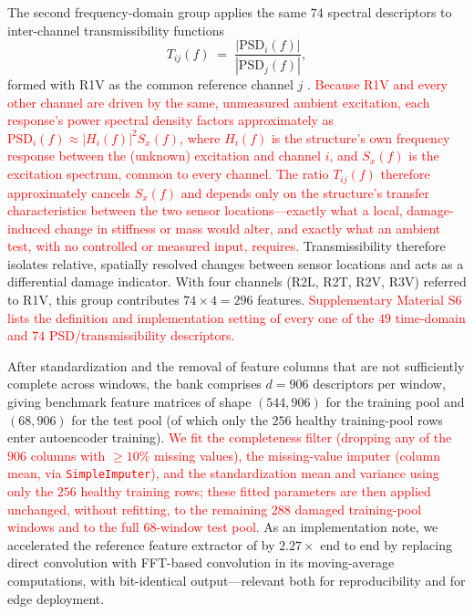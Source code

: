 \documentclass[11pt,a4paper]{article}
\begin{document}
The second frequency-domain group applies the same $74$ spectral descriptors to
inter-channel transmissibility functions
\begin{equation}
T_{ij}(f) \;=\; \frac{|\mathrm{PSD}_i(f)|}{|\mathrm{PSD}_j(f)|},
\label{eq:transmissibility}
\end{equation}
formed with R1V as the common reference channel $j$ \cite{johnson2002}.
\textcolor{red}{Because R1V and every other channel are driven by the same,
unmeasured ambient excitation, each response's power spectral density
factors approximately as $\mathrm{PSD}_i(f) \approx |H_i(f)|^2 S_x(f)$, where
$H_i(f)$ is the structure's own frequency response between the (unknown)
excitation and channel $i$, and $S_x(f)$ is the excitation spectrum, common
to every channel. The ratio $T_{ij}(f)$ therefore approximately cancels
$S_x(f)$ and depends only on the structure's transfer characteristics
between the two sensor locations---exactly what a local, damage-induced
change in stiffness or mass would alter, and exactly what an ambient
test, with no controlled or measured input, requires.} Transmissibility
therefore isolates relative, spatially resolved changes between sensor
locations and acts as a differential damage indicator. With four channels
(R2L, R2T, R2V, R3V) referred to R1V, this group contributes $74\times4=296$
features. \textcolor{red}{Supplementary Material S6 lists the definition and
implementation setting of every one of the $49$ time-domain and $74$
PSD/transmissibility descriptors.}

After standardization and the removal of feature columns that are not
sufficiently complete across windows, the bank comprises $d = 906$ descriptors
per window, giving benchmark feature matrices of shape $(544, 906)$ for the
training pool and $(68, 906)$ for the test pool (of which only the $256$ healthy
training-pool rows enter autoencoder training). \textcolor{red}{We fit the completeness filter (dropping any of the $906$
columns with $\geq10\%$ missing values), the missing-value imputer (column
mean, via \texttt{SimpleImputer}), and the standardization mean and variance
using only the $256$ healthy training rows; these fitted parameters are then
applied unchanged, without refitting, to the remaining $288$ damaged
training-pool windows and to the full $68$-window test pool.} As an implementation note, we accelerated the reference feature
extractor of \cite{abdrabo2024} by $2.27\times$ end to end by replacing direct
convolution with FFT-based convolution in its moving-average computations, with
bit-identical output---relevant both for reproducibility and for edge
deployment.
\end{document}
